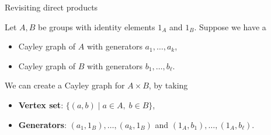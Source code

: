 \documentclass[8pt, handout]{beamer}
\newcommand{\Pause}{}
\begin{document}

\begin{frame}{Revisiting direct products} 
  
  Let $A,B$ be groups with identity elements $1_A$ and $1_B$. \Pause
  Suppose we have a
  \begin{itemize}
  \item Cayley graph of $A$ with generators $a_1,\dots,a_k$, \smallskip\Pause
  \item Cayley graph of $B$ with generators
    $b_1,\dots,b_\ell$. \smallskip\Pause
  \end{itemize}
  
  We can create a Cayley graph for $A\times B$, by taking
  \begin{itemize}
  \item \textbf{Vertex set}: $\{(a,b)\mid a\in A,\; b\in B\}$, \smallskip\Pause
  \item \textbf{Generators}: $(a_1,1_B),\dots,(a_k,1_B)$ and
    $(1_A,b_1),\dots,(1_A,b_\ell)$.
  \end{itemize}
  
  \vspace{-2mm}\Pause


\end{frame}
\end{document}
